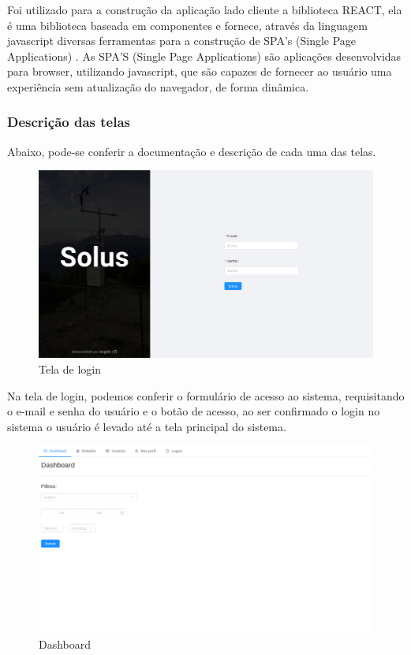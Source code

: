 Foi utilizado para a construção da aplicação lado cliente a biblioteca REACT, ela é uma biblioteca baseada em componentes e fornece, através da linguagem javascript diversas ferramentas para a construção de SPA's (Single Page Applications) \cite{what_react}. As SPA'S (Single Page Applications) são aplicações desenvolvidas para browser, utilizando javascript, que são capazes de fornecer ao usuário uma experiência sem atualização do navegador, de forma dinâmica.

\subsubsection{Descrição das telas}

Abaixo, pode-se conferir a documentação e descrição de cada uma das telas.

\begin{figure}[H]
    \centering
    \caption{Tela de login} \label{fig:screen_login}
    \includegraphics[scale=0.3]{telas/login.png}
    \hfill
{}
\end{figure}

Na tela de login, podemos conferir o formulário de acesso ao sistema, requisitando o e-mail e senha do usuário e o botão de acesso, ao ser confirmado o login no sistema o usuário é levado até a tela principal do sistema.

\begin{figure}[H]
    \centering
    \caption{Dashboard} \label{fig:screen_filtros}
    \includegraphics[scale=0.3]{telas/filtros.png}
    \hfill
{}
\end{figure}

